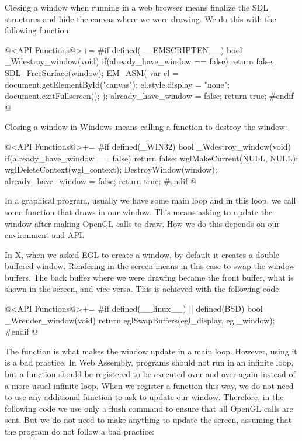 
Closing a window when running in a web browser means finalize the SDL
structures and hide the canvas where we were drawing. We do this with
the following function:

\iniciocodigo
@<API Functions@>+=
#if defined(__EMSCRIPTEN__)
bool _Wdestroy_window(void){
  if(already_have_window == false)
    return false;
  SDL_FreeSurface(window);
  EM_ASM(
    var el = document.getElementById("canvas");
    el.style.display = "none";
    document.exitFullscreen();
  );
  already_have_window = false;
  return true;
}
#endif
@
\fimcodigo


Closing a window in Windows means calling a function to destroy the
window:

\iniciocodigo
@<API Functions@>+=
#if defined(_WIN32)
bool _Wdestroy_window(void){
  if(already_have_window == false)
    return false;
  wglMakeCurrent(NULL, NULL);
  wglDeleteContext(wgl_context);
  DestroyWindow(window);
  already_have_window = false;
  return true;
}
#endif
@
\fimcodigo


In a graphical program, usually we have some main loop and in this
loop, we call some function that draws in our window. This means
asking to update the window after making OpenGL calls to draw. How we
do this depends on our environment and API.


In X, when we asked EGL to create a window, by default it creates a
double buffered window. Rendering in the screen means in this case to
swap the window buffers. The back buffer where we were drawing became
the front buffer, what is shown in the screen, and vice-versa. This is
achieved with the following code:

\iniciocodigo
@<API Functions@>+=
#if defined(__linux__) || defined(BSD)
bool _Wrender_window(void){
  return eglSwapBuffers(egl_display, egl_window);
}
#endif
@
\fimcodigo


The function  is what makes the window
update in a main loop. However, using it is a bad practice. In Web
Assembly, programs should not run in an infinite loop, but a function
should be registered to be executed over and over again instead of a
more usual infinite loop. When we register a function this way, we do
not need to use any additional function to ask to update our
window. Therefore, in the following code we use only a flush command
to ensure that all OpenGL calls are sent. But we do not need to make
anything to update the screen, assuming that the program do not follow
a bad practice:

